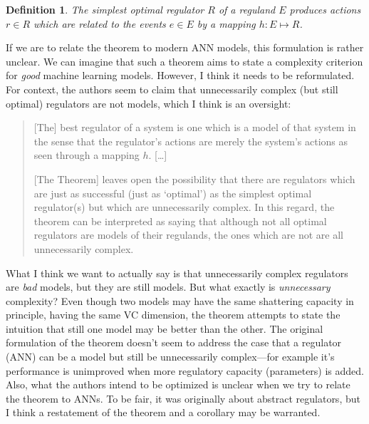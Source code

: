 \documentclass[11pt, oneside]{article}   	%
\newtheorem{theorem}{Definition}
\begin{document}

\begin{theorem}
\label{GRT}
The simplest optimal regulator $R$ of a reguland $E$ produces actions $r \in R$ which are related to the events $e \in E$ by a mapping $h:E\mapsto R$.
\end{theorem}

If we are to relate the theorem to modern ANN models, this formulation is rather unclear.  We can imagine that such a theorem aims to state a complexity criterion for \emph{good} machine learning models.  However, I think it needs to be reformulated.  For context, the authors seem to claim that unnecessarily complex (but still optimal) regulators are not models, which I think is an oversight:

\begin{quote}
[The] best regulator of a system is one which is a model of that system in the sense that the regulator's actions are merely the system's actions as seen through a mapping $h$.  [\dots] 

[The Theorem] leaves open the possibility that there are regulators which are just as successful (just as `optimal') as the simplest optimal regulator(s) but which are unnecessarily complex.  In this regard, the theorem can be interpreted as saying that although not all optimal regulators are models of their regulands, the ones which are not are all unnecessarily complex.  \cite{AshbyConant1970}
\end{quote}





What I think we want to actually say is that unnecessarily complex regulators are \emph{bad} models, but they are still models.  But what exactly is \emph{unnecessary} complexity?  Even though two models may have the same shattering capacity in principle, having the same VC dimension, the theorem attempts to state the intuition that still one model may be better than the other.  The original formulation of the theorem doesn't seem to address the case that a regulator (ANN) can be a model but still be unnecessarily complex---for example it's performance is unimproved when more regulatory capacity (parameters) is added.  Also, what the authors intend to be optimized is unclear when we try to relate the theorem to ANNs.  To be fair, it was originally about abstract regulators, but I think a restatement of the theorem and a corollary may be warranted.
\end{document}
